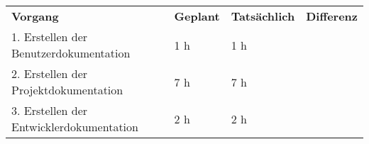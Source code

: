 \begin{tabular}{llll}
\rowcolor{heading}\textbf{Vorgang} & \textbf{Geplant} & \textbf{Tatsächlich} & \textbf{Differenz} \\
1. Erstellen der Benutzerdokumentation & 1 h   & 1 h   &  \\
\rowcolor{odd}2. Erstellen der Projektdokumentation & 7 h   & 7 h   & \\
3. Erstellen der Entwicklerdokumentation & 2 h   & 2 h   &  \\
\end{tabular}
